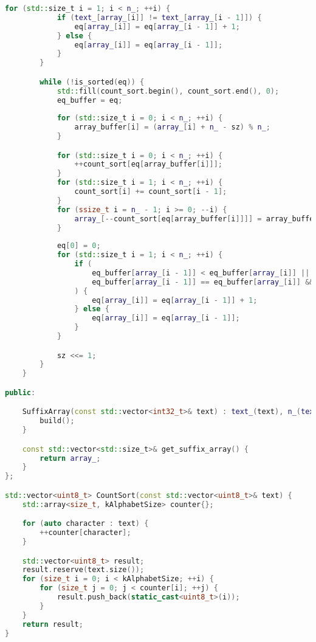 \begin{lstlisting}[language=C++]
        for (std::size_t i = 1; i < n_; ++i) {
            if (text_[array_[i]] != text_[array_[i - 1]]) {
                eq[array_[i]] = eq[array_[i - 1]] + 1;
            } else {
                eq[array_[i]] = eq[array_[i - 1]];
            }
        }

        while (!is_sorted(eq)) {
            std::fill(count_sort.begin(), count_sort.end(), 0);
            eq_buffer = eq;
            
            for (std::size_t i = 0; i < n_; ++i) {
                array_buffer[i] = (array_[i] + n_ - sz) % n_;
            }

            for (std::size_t i = 0; i < n_; ++i) {
                ++count_sort[eq[array_buffer[i]]];
            }
            for (std::size_t i = 1; i < n_; ++i) {
                count_sort[i] += count_sort[i - 1];
            }
            for (ssize_t i = n_ - 1; i >= 0; --i) {
                array_[--count_sort[eq[array_buffer[i]]]] = array_buffer[i];
            }
            
            eq[0] = 0;
            for (std::size_t i = 1; i < n_; ++i) {
                if (
                    eq_buffer[array_[i - 1]] < eq_buffer[array_[i]] ||
                    eq_buffer[array_[i - 1]] == eq_buffer[array_[i]] && eq_buffer[(array_[i - 1] + sz) % n_] < eq_buffer[(array_[i] + sz) % n_]
                ) {
                    eq[array_[i]] = eq[array_[i - 1]] + 1;
                } else {
                    eq[array_[i]] = eq[array_[i - 1]];
                }
            }

            sz <<= 1;
        }
    }

public:

    SuffixArray(const std::vector<int32_t>& text) : text_(text), n_(text_.size()), array_(n_, -1) {
        build();
    }

    const std::vector<std::size_t>& get_suffix_array() {
        return array_;
    }
};

std::vector<uint8_t> CountSort(const std::vector<uint8_t>& text) {
    std::array<size_t, kAlphabetSize> counter{};

    for (auto character : text) {
        ++counter[character];
    }

    std::vector<uint8_t> result;
    result.reserve(text.size());
    for (size_t i = 0; i < kAlphabetSize; ++i) {
        for (size_t j = 0; j < counter[i]; ++j) {
            result.push_back(static_cast<uint8_t>(i));
        }
    }
    return result;
}


\end{lstlisting}
